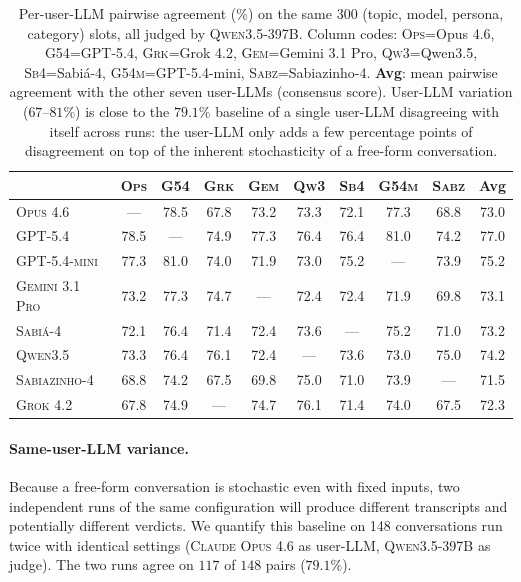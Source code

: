 \documentclass[11pt,a4paper]{article}
\begin{document}
\begin{table}[!htbp]
\centering \scriptsize
\begin{tabular}{l|cccccccc|c}
\toprule
 & \textsc{Ops} & \textsc{G54} & \textsc{Grk} & \textsc{Gem} & \textsc{Qw3} & \textsc{Sb4} & \textsc{G54m} & \textsc{Sabz} & Avg \\
\midrule
\textsc{Opus 4.6}       & ---   & 78.5 & 67.8 & 73.2 & 73.3 & 72.1 & 77.3 & 68.8 & 73.0 \\
\textsc{GPT-5.4}        & 78.5 & ---   & 74.9 & 77.3 & 76.4 & 76.4 & 81.0 & 74.2 & 77.0 \\
\textsc{GPT-5.4-mini}   & 77.3 & 81.0 & 74.0 & 71.9 & 73.0 & 75.2 & ---   & 73.9 & 75.2 \\
\textsc{Gemini 3.1 Pro} & 73.2 & 77.3 & 74.7 & ---   & 72.4 & 72.4 & 71.9 & 69.8 & 73.1 \\
\textsc{Sabi\'a-4}      & 72.1 & 76.4 & 71.4 & 72.4 & 73.6 & ---   & 75.2 & 71.0 & 73.2 \\
\textsc{Qwen3.5}        & 73.3 & 76.4 & 76.1 & 72.4 & ---   & 73.6 & 73.0 & 75.0 & 74.2 \\
\textsc{Sabiazinho-4}   & 68.8 & 74.2 & 67.5 & 69.8 & 75.0 & 71.0 & 73.9 & ---   & 71.5 \\
\textsc{Grok 4.2}       & 67.8 & 74.9 & ---   & 74.7 & 76.1 & 71.4 & 74.0 & 67.5 & 72.3 \\
\bottomrule
\end{tabular}
\caption{Per-user-LLM pairwise agreement (\%) on the same 300 (topic, model, persona, category) slots, all judged by \textsc{Qwen3.5-397B}. Column codes: \textsc{Ops}=Opus 4.6, \textsc{G54}=GPT-5.4, \textsc{Grk}=Grok 4.2, \textsc{Gem}=Gemini 3.1 Pro, \textsc{Qw3}=Qwen3.5, \textsc{Sb4}=Sabi\'a-4, \textsc{G54m}=GPT-5.4-mini, \textsc{Sabz}=Sabiazinho-4. \textbf{Avg}: mean pairwise agreement with the other seven user-LLMs (consensus score). User-LLM variation ($67$--$81\%$) is close to the $79.1\%$ baseline of a single user-LLM disagreeing with itself across runs: the user-LLM only adds a few percentage points of disagreement on top of the inherent stochasticity of a free-form conversation.}
\label{tab:userllm-agreement}
\end{table}

\paragraph{Same-user-LLM variance.} Because a free-form conversation is stochastic even with fixed inputs, two independent runs of the same configuration will produce different transcripts and potentially different verdicts. We quantify this baseline on 148 conversations run twice with identical settings (\textsc{Claude Opus 4.6} as user-LLM, \textsc{Qwen3.5-397B} as judge). The two runs agree on $117$ of $148$ pairs ($79.1\%$).
\end{document}
